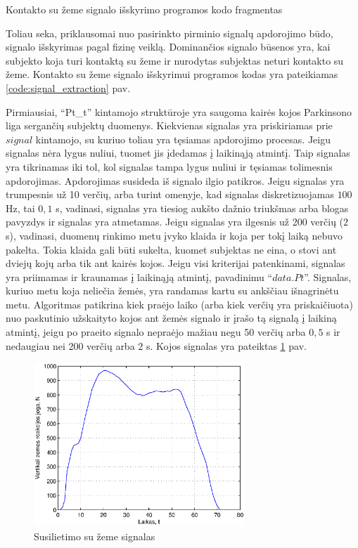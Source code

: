 \documentclass[]{vgtuef}
\begin{document}
\begin{cfigure}
  \centering
  \caption{Kontakto su žeme signalo išskyrimo programos kodo fragmentas}
  \label{code:signal_extraction}
  
\end{cfigure}

Toliau seka, priklausomai nuo pasirinkto pirminio signalų apdorojimo būdo, signalo išskyrimas pagal fizinę veiklą. Dominančios signalo būsenos yra, kai subjekto koja turi kontaktą su žeme ir nurodytas subjektas neturi kontakto su žeme. Kontakto su žeme signalo išskyrimui programos kodas yra pateikiamas \ref{code:signal_extraction} pav.

Pirmiausiai, ``Pt\_t'' kintamojo struktūroje yra saugoma kairės kojos Parkinsono liga sergančių subjektų duomenys. Kiekvienas signalas yra priskiriamas prie $signal$ kintamojo, su kuriuo toliau yra tęsiamas apdorojimo procesas. Jeigu signalas nėra lygus nuliui, tuomet jis įdedamas į laikinąją atmintį. Taip signalas yra tikrinamas iki tol, kol signalas tampa lygus nuliui ir tęsiamas tolimesnis apdorojimas. Apdorojimas susideda iš signalo ilgio patikros. Jeigu signalas yra trumpesnis už 10 verčių, arba turint omenyje, kad signalas diskretizuojamas $100$ Hz, tai $0,1$ s, vadinasi, signalas yra tiesiog aukšto dažnio triukšmas arba blogas pavyzdys ir signalas yra atmetamas. Jeigu signalas yra ilgesnis už 200 verčių ($2$ s), vadinasi, duomenų rinkimo metu įvyko klaida ir koja per tokį laiką nebuvo pakelta. Tokia klaida gali būti sukelta, kuomet subjektas ne eina, o stovi ant dviejų kojų arba tik ant kairės kojos. Jeigu visi kriterijai patenkinami, signalas yra priimamas ir kraunamas į laikinąją atmintį, pavadinimu ``$data.Pt$''. Signalas, kuriuo metu koja neliečia žemės, yra randamas kartu su ankščiau išnagrinėtu metu. Algoritmas patikrina kiek praėjo laiko (arba kiek verčių yra priskaičiuota) nuo paskutinio užskaityto kojos ant žemės signalo ir įrašo tą signalą į laikiną atmintį, jeigu po praeito signalo nepraėjo mažiau negu 50 verčių arba $0,5$ s ir nedaugiau nei 200 verčių arba $2$ s. Kojos signalas yra pateiktas \ref{fig:stance_phase} pav.

\begin{figure}[!t]
  \centering
  \includegraphics[width=300px]{figures/09_sample_stance_phase.eps}
  \caption{Susilietimo su žeme signalas}
  \label{fig:stance_phase}
\end{figure}
\end{document}
